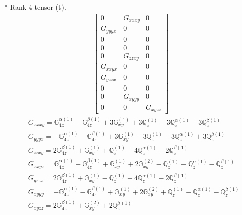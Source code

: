 \documentclass[fleqn,8pt,landscape]{jsarticle}
\begin{document}
* Rank 4 tensor (t).
\begin{align*}
\begin{bmatrix} 0 & G_{xxxy} & 0 \\ G_{yyyx} & 0 & 0 \\ 0 & 0 & 0 \\ 0 & 0 & 0 \\ 0 & G_{zzxy} & 0 \\ G_{xxyx} & 0 & 0 \\ G_{yzzx} & 0 & 0 \\ 0 & 0 & 0 \\ 0 & G_{xyyy} & 0 \\ 0 & 0 & G_{xyzz} \end{bmatrix}
\end{align*}
\begin{align*}
& G_{xxxy} = \mathbb{G}_{4z}^{\alpha(1)} - \mathbb{G}_{4z}^{\beta(1)} + 3 \mathbb{G}_{xy}^{(1)} + 3 \mathbb{Q}_{z}^{(1)} - 3 \mathbb{Q}_{z}^{\alpha(1)} + 3 \mathbb{Q}_{z}^{\beta(1)} \\
& G_{yyyx} = - \mathbb{G}_{4z}^{\alpha(1)} - \mathbb{G}_{4z}^{\beta(1)} + 3 \mathbb{G}_{xy}^{(1)} - 3 \mathbb{Q}_{z}^{(1)} + 3 \mathbb{Q}_{z}^{\alpha(1)} + 3 \mathbb{Q}_{z}^{\beta(1)} \\
& G_{zzxy} = 2 \mathbb{G}_{4z}^{\beta(1)} + \mathbb{G}_{xy}^{(1)} + \mathbb{Q}_{z}^{(1)} + 4 \mathbb{Q}_{z}^{\alpha(1)} - 2 \mathbb{Q}_{z}^{\beta(1)} \\
& G_{xxyx} = \mathbb{G}_{4z}^{\alpha(1)} - \mathbb{G}_{4z}^{\beta(1)} + \mathbb{G}_{xy}^{(1)} + 2 \mathbb{G}_{xy}^{(2)} - \mathbb{Q}_{z}^{(1)} + \mathbb{Q}_{z}^{\alpha(1)} - \mathbb{Q}_{z}^{\beta(1)} \\
& G_{yzzx} = 2 \mathbb{G}_{4z}^{\beta(1)} + \mathbb{G}_{xy}^{(1)} - \mathbb{Q}_{z}^{(1)} - 4 \mathbb{Q}_{z}^{\alpha(1)} - 2 \mathbb{Q}_{z}^{\beta(1)} \\
& G_{xyyy} = - \mathbb{G}_{4z}^{\alpha(1)} - \mathbb{G}_{4z}^{\beta(1)} + \mathbb{G}_{xy}^{(1)} + 2 \mathbb{G}_{xy}^{(2)} + \mathbb{Q}_{z}^{(1)} - \mathbb{Q}_{z}^{\alpha(1)} - \mathbb{Q}_{z}^{\beta(1)} \\
& G_{xyzz} = 2 \mathbb{G}_{4z}^{\beta(1)} + \mathbb{G}_{xy}^{(2)} + 2 \mathbb{Q}_{z}^{\beta(1)}
\end{align*}
\end{document}
